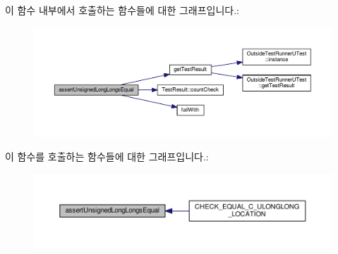 이 함수 내부에서 호출하는 함수들에 대한 그래프입니다.\+:
\nopagebreak
\begin{figure}[H]
\begin{center}
\leavevmode
\includegraphics[width=350pt]{class_utest_shell_ac4b53cc2ffb947f2e6ac8c19a531dfbb_cgraph}
\end{center}
\end{figure}




이 함수를 호출하는 함수들에 대한 그래프입니다.\+:
\nopagebreak
\begin{figure}[H]
\begin{center}
\leavevmode
\includegraphics[width=350pt]{class_utest_shell_ac4b53cc2ffb947f2e6ac8c19a531dfbb_icgraph}
\end{center}
\end{figure}


